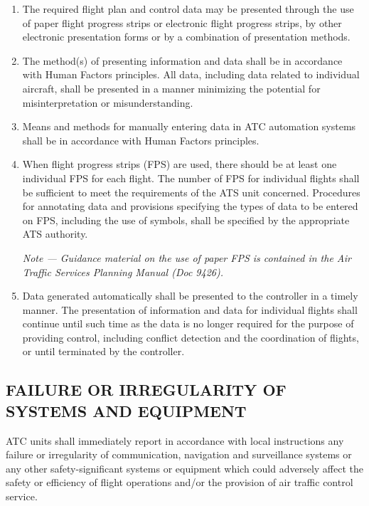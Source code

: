 \documentclass[../main.tex]{subfiles}
\begin{document}
    \begin{enumerate}
        \item The required flight plan and control data may be presented through the use of paper flight progress strips or electronic flight progress strips, by other electronic presentation forms or by a combination of presentation methods.
        \item The method(s) of presenting information and data shall be in accordance with Human Factors principles. All data, including data related to individual aircraft, shall be presented in a manner minimizing the potential for misinterpretation or misunderstanding.
        \item Means and methods for manually entering data in ATC automation systems shall be in accordance with Human Factors principles.
        \item When flight progress strips (FPS) are used, there should be at least one individual FPS for each flight. The number of FPS for individual flights shall be sufficient to meet the requirements of the ATS unit concerned. Procedures for annotating data and provisions specifying the types of data to be entered on FPS, including the use of symbols, shall be specified by the appropriate ATS authority.

        \textit{Note --- Guidance material on the use of paper FPS is contained in the Air Traffic Services Planning Manual (Doc 9426).}

        \item Data generated automatically shall be presented to the controller in a timely manner. The presentation of information and data for individual flights shall continue until such time as the data is no longer required for the purpose of providing control, including conflict detection and the coordination of flights, or until terminated by the controller.
    \end{enumerate}

    \subsection[Failure of irregularity of systems and equipment]{FAILURE OR IRREGULARITY OF \\ SYSTEMS AND EQUIPMENT}

    ATC units shall immediately report in accordance with local instructions any failure or irregularity of communication, navigation and surveillance systems or any other safety-significant systems or equipment which could adversely affect the safety or efficiency of flight operations and/or the provision of air traffic control service.
\end{document}
